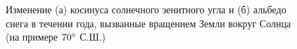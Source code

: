 \documentclass[a4paper, fontsize=14pt]{scrartcl}
\begin{document}
\begin{figure}[h]
    \begin{minipage}[h]{0.49\linewidth}
    \end{minipage}
    \hfill
    \begin{minipage}[h]{0.49\linewidth}
    \end{minipage}
    \caption{Изменение (а) косинуса солнечного зенитного угла и (б) альбедо снега в течении года, вызванные вращением Земли вокруг Солнца (на примере $70\degree$ С.Ш.)}
    \label{fig:image}
\end{figure}
\end{document}
